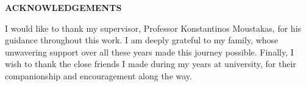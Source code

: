 \begin{center}  \Large{\textbf{ACKNOWLEDGEMENTS}}  \end{center}
\vspace{3pt}
I would like to thank my supervisor, Professor Konstantinos Moustakas, for his
guidance throughout this work. I am deeply grateful to my family, whose
unwavering support over all these years made this journey possible. Finally, I
wish to thank the close friends I made during my years at university, for their
companionship and encouragement along the way.
